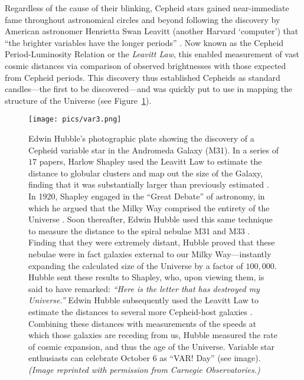 Regardless of the cause of their blinking, Cepheid stars gained near-immediate fame throughout astronomical circles and beyond following the discovery by American astronomer Henrietta Swan Leavitt (another Harvard `computer') that ``the brighter variables have the longer periods'' \citep{1908AnHar..60...87L, 1912HarCi.173....1L}. 
Now known as the Cepheid Period-Luminosity Relation or the \emph{Leavitt Law}, this enabled measurement of vast cosmic distances via comparison of observed brightnesses with those expected from Cepheid periods. 
This discovery thus established Cepheids as standard candles---the first to be discovered---and was quickly put to use in mapping the structure of the Universe (see Figure~\ref{fig:var-day}). 




\begin{figure}
    \centering
    \texttt{[image: pics/var3.png]}
    \caption[VAR! Day]{Edwin Hubble's photographic plate showing the discovery of a Cepheid variable star in the Andromeda Galaxy (M31). 
    In a series of $17$ papers, Harlow Shapley used the Leavitt Law to estimate the distance to globular clusters and map out the size of the Galaxy, finding that it was substantially larger than previously estimated \citep{1918ApJ....48...89S}. 
    In 1920, Shapley engaged in the ``Great Debate'' of astronomy, in which he argued that the Milky Way comprised the entirety of the Universe \citep{1921BuNRC...2..171S}. 
    Soon thereafter, Edwin Hubble used this same technique to measure the distance to the spiral nebulae M31 and M33 \citep[][see image]{1925Obs....48..139H}. 
    Finding that they were extremely distant, Hubble proved that these nebulae were in fact galaxies external to our Milky Way---instantly expanding the calculated size of the Universe by a factor of $100,000$. 
    Hubble sent these results to Shapley, who, upon viewing them, is said to have remarked: \emph{``Here is the letter that has destroyed my Universe.''} 
    Edwin Hubble subsequently used the Leavitt Law to estimate the distances to several more Cepheid-host galaxies \citep{1929PNAS...15..168H}. 
    Combining these distances with measurements of the speeds at which those galaxies are receding from us, Hubble measured the rate of cosmic expansion, and thus the age of the Universe. 
    Variable star enthusiasts can celebrate October 6 as ``VAR! Day'' (see image). 
    \emph{(Image reprinted with permission from Carnegie Observatories.)}
    \label{fig:var-day}}
\end{figure}

